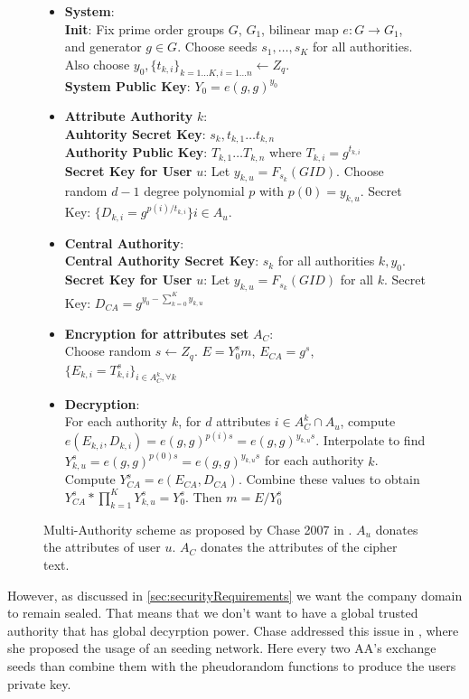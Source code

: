 \documentclass[twocolumn]{article}
\begin{document}
\begin{figure}[!h]
\begin{itemize}
	\item \textbf{System}:\\
	\textbf{Init}: Fix prime order groups $G$, $G_1$, bilinear map $e: G \rightarrow G_1$, and generator $g \in G$. Choose seeds $s_1, \dots, s_K$ for all authorities. Also choose $y_0 , \{t_{k,i}\}_{k=1...K,i=1\dots n} \leftarrow Z_q$. \\
	\textbf{System Public Key}: $Y_0 = e(g, g)^{y_0}$
	\item \textbf{Attribute Authority} $k$: \\
	\textbf{Auhtority Secret Key}: $s_k, t_{k, 1} \dots t_{k,n} $ \\
	\textbf{Authority Public Key}: $ T_{k, 1} \dots T_{k, n}$ where $T_{k, i} = g^{t_{k,i}} $\\
	\textbf{Secret Key for User } $u$: Let $y_{k,u} = F_{s_k}(GID)$. Choose random $d - 1$ degree polynomial $p$ with $p(0) = y_{k,u}$. Secret Key: $\{D_{k,i} = g^{p(i)/t_{k,i}} \}i \in A_u $.
	\item \textbf{Central Authority}:\\
	\textbf{Central Authority Secret Key}: $s_k$ for all authorities $k, y_0$.  \\
	\textbf{Secret Key for User} $u$: Let $y_{k,u} = F_{s_k}(GID)$ for all $k$. Secret Key: $D_{CA} = g^{y_0 - \sum^K_{k=0} y_{k,u}}$
	\item \textbf{Encryption for attributes set } $A_C$: \\
	Choose random $s \leftarrow Z_q$. $E = Y_0^s m$, $E_{CA} = g^s$, $\{E_{k,i} = T^s_{k,i}\}_{i \in A^k_C, \forall k}$
	\item \textbf{Decryption}:\\
	For each authority $k$, for $d$ attributes $i \in A^k_C \cap A_u$, compute $e(E_{k,i}, D_{k,i}) = e(g,g)^{p(i)s} = e(g,g)^{y_{k,u}s}$.  Interpolate to find $Y^s_{k,u} = e(g, g)^{p(0)s} = e(g,g)^{y_{k,u}s}$ for each authority $k$. Compute $Y^s_{CA} = e(E_{CA} , D_{CA})$. Combine these values to obtain $Y^s_{CA} * \prod^K_{k=1} Y^s_{k,u} = Y^s_0$. Then $m = E/Y_0^s$
\end{itemize}
\caption{Multi-Authority scheme as proposed by Chase 2007 in \cite{chase2007multi}. $A_u$ donates the attributes of user $u$. $A_C$ donates the attributes of the cipher text.}
\label{fig:chase-multi-auth}
\end{figure}


However, as discussed in \ref{sec:securityRequirements} we want the company domain to remain sealed. That means that we don't want to have a global trusted authority that has global decyrption power. 
Chase addressed this issue in \cite{chase2009improving}, where she proposed the usage of an seeding network. Here every two AA's exchange seeds than combine them with the pheudorandom functions to produce the users private key. 
\end{document}

